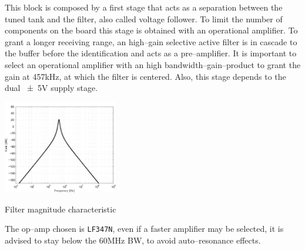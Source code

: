 This block is composed by a first stage that acts as a separation between the tuned tank and the filter, also called voltage follower. To limit the number of components on the board this stage is obtained with an operational amplifier. To grant a longer receiving range, an high--gain selective active filter is in cascade to the buffer before the identification and acts as a pre--amplifier. It is important to select an operational amplifier with an high bandwidth--gain--product to grant the gain at \num{457}\si{\kilo\hertz}, at which the filter is centered. Also, this stage depends to the dual \num{\pm 5}\si{\volt} supply stage. 
\begin{marginfigure}
	\centering
	\includegraphics[width=5cm]{ch2/img/filter1.pdf}
	\caption{Filter magnitude characteristic}
\end{marginfigure}

The op--amp chosen is \texttt{LF347N}, even if a faster amplifier may be selected, it is advised to stay below the \num{60}\si{\mega\hertz} BW, to avoid auto--resonance effects.

